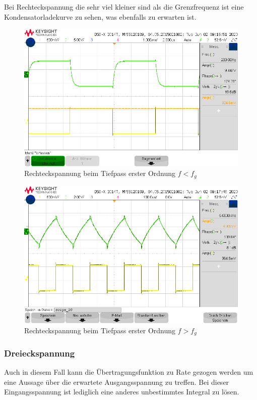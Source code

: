 Bei Rechteckspannung die sehr viel kleiner sind als die Grenzfrequenz ist eine Kondensatorladekurve zu sehen, was ebenfalls zu erwarten ist. 

\begin{figure}[H]
    \centering
    \includegraphics[width=\costumPicWidth]{Lab_2/Messungen/TP_first_order/scope_26.png}
    \caption{Rechteckspannung beim Tiefpass erster Ordnung $f < f_g$}
    \label{fig:Rechteck_Tiefpass_erster_Ordnung_small_f}
\end{figure}
\begin{figure}[H]
    \centering
    \includegraphics[width=\costumPicWidth]{Lab_2/Messungen/TP_first_order/scope_29.png}
    \caption{Rechteckspannung beim Tiefpass erster Ordnung $f > f_g$}
    \label{fig:Rechteck_Tiefpass_erster_Ordnung_big_f}
\end{figure}

\subsubsection{Dreieckspannung}
Auch in diesem Fall kann die Übertragungsfunktion zu Rate gezogen werden um eine Aussage über die erwartete Ausgangsspannung zu treffen. Bei dieser Eingangsspannung ist lediglich eine anderes unbestimmtes Integral zu lösen.

